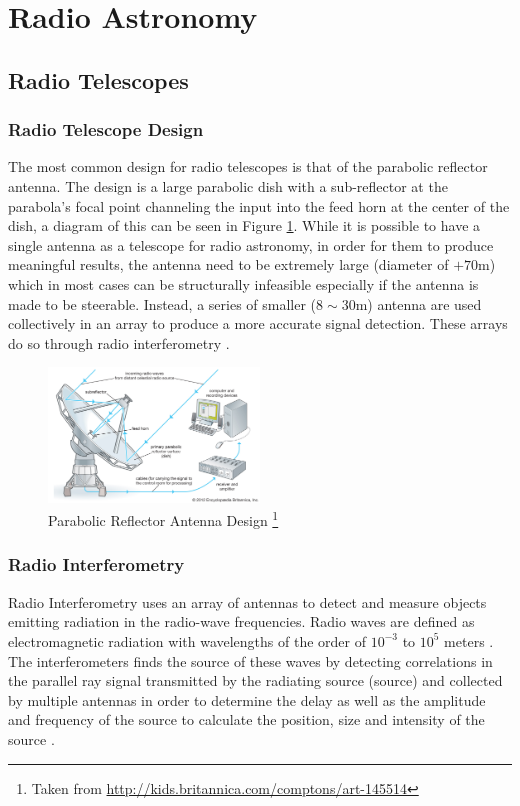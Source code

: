 \section{Radio Astronomy}\label{ra}
\subsection{Radio Telescopes}\label{ra:sec:rt}
%
\subsubsection{Radio Telescope Design}
The most common design for radio telescopes is that of the parabolic reflector antenna. The design is a large parabolic dish with a sub-reflector at the parabola's focal point channeling the input into the feed horn at the center of the dish, a diagram of this can be seen in Figure \ref{ra:fig:para}. While it is possible to have a single antenna as a telescope for radio astronomy, in order for them to produce meaningful results, the antenna need to be extremely large (diameter of $+70$m) which in most cases can be structurally infeasible especially if the antenna is made to be steerable. Instead, a series of smaller ($8\sim30$m) antenna are used collectively in an array to produce a more accurate signal detection. These arrays do so through radio interferometry \citep{cheng2009radio}.
%
\begin{figure}[H]
	\centering
	\includegraphics[width=0.5\textwidth]{Images/Telescope.jpg}
	\caption[]{Parabolic Reflector Antenna Design \footnote{Taken from \url{http://kids.britannica.com/comptons/art-145514}} }
	\label{ra:fig:para}
\end{figure}
%
\subsubsection{Radio Interferometry}\label{ra:ssec:des}
Radio Interferometry uses an array of antennas to detect and measure objects emitting radiation in the radio-wave frequencies. Radio waves are defined as electromagnetic radiation with wavelengths of the order of $10^{-3}$ to $10^5$ meters \citep{cheng2009radio}. The interferometers finds the source of these waves by detecting correlations in the parallel ray signal transmitted by the radiating source (source) and collected by multiple antennas in order to determine the delay as well as the amplitude and frequency of the source to calculate the position, size and intensity of the source \citep{thompson2008interferometry}.
%
